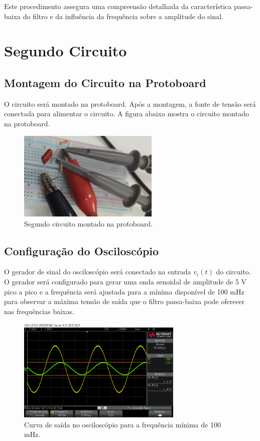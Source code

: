 \documentclass[
	12pt,				%
	openright,			%
	twoside,			%
	a4paper,			%
	english,			%
	french,				%
	spanish,			%
	brazil,				%
	]{abntex2}
\begin{document}
Este procedimento assegura uma compreensão detalhada da característica passa-baixa do filtro e da influência da frequência sobre a amplitude do sinal.

\section{Segundo Circuito}

\subsection{Montagem do Circuito na Protoboard}

O circuito será montado na protoboard. Após a montagem, a fonte de tensão será conectada para alimentar o circuito. A figura abaixo mostra o circuito montado na protoboard.

\begin{figure}[H]
    \centering
    \includegraphics[width=0.6\textwidth]{imgs/protoboard_circuit2.jpg}
    \caption{Segundo circuito montado na protoboard.}
    \label{fig:protoboard_circuit2}
\end{figure}

\subsection{Configuração do Osciloscópio}

O gerador de sinal do osciloscópio será conectado na entrada \( v_i(t) \) do circuito. O gerador será configurado para gerar uma onda senoidal de amplitude de 5 V pico a pico e a frequência será ajustada para a mínima disponível de 100 mHz para observar a máxima tensão de saída que o filtro passa-baixa pode oferecer nas frequências baixas.

\begin{figure}[H]
    \centering
    \includegraphics[width=0.7\textwidth]{imgs/second_oscilloscope_low_frequency_output.jpg}
    \caption{Curva de saída no osciloscópio para a frequência mínima de 100 mHz.}
    \label{fig:second_low_frequency_output}
\end{figure}
\end{document}
